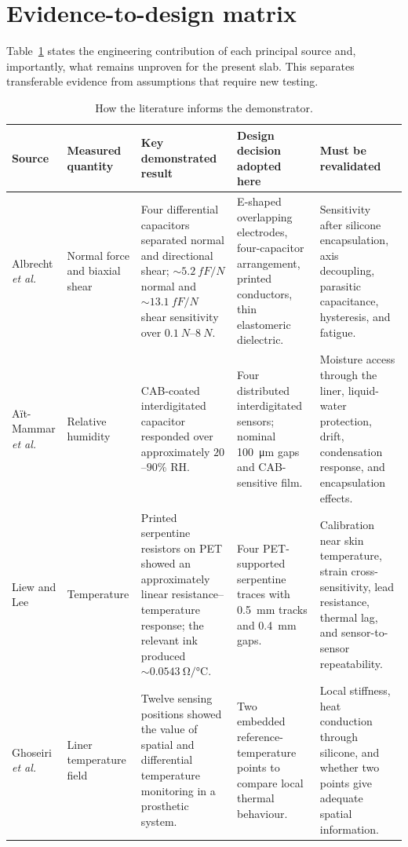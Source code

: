 \documentclass[10pt,twocolumn]{article}
\begin{document}
\section{Evidence-to-design matrix}

Table~\ref{tab:evidence} states the engineering contribution of each principal
source and, importantly, what remains unproven for the present slab. This
separates transferable evidence from assumptions that require new testing.

\begin{table}[t]
\centering
\caption{How the literature informs the demonstrator.}
\label{tab:evidence}
\footnotesize
\renewcommand{\arraystretch}{1.16}
\begin{tabularx}{\textwidth}{@{}p{}p{}
X X X@{}}
\toprule
\textbf{Source} & \textbf{Measured quantity} &
\textbf{Key demonstrated result} & \textbf{Design decision adopted here} &
\textbf{Must be revalidated} \\
\midrule
Albrecht \textit{et al.} \cite{albrecht2019} &
Normal force and biaxial shear &
Four differential capacitors separated normal and directional shear;
\(\sim\SI{5.2}{fF/N}\) normal and
\(\sim\SI{13.1}{fF/N}\) shear sensitivity over
\(\SIrange{0.1}{8}{N}\). &
E-shaped overlapping electrodes, four-capacitor arrangement, printed
conductors, thin elastomeric dielectric. &
Sensitivity after silicone encapsulation, axis decoupling, parasitic
capacitance, hysteresis, and fatigue. \\

Aït-Mammar \textit{et al.} \cite{aitmammar2020} &
Relative humidity &
CAB-coated interdigitated capacitor responded over approximately
\(20\)--\(90\%\) RH. &
Four distributed interdigitated sensors; nominal
\SI{100}{\micro\metre} gaps and CAB-sensitive film. &
Moisture access through the liner, liquid-water protection, drift,
condensation response, and encapsulation effects. \\

Liew and Lee \cite{liew2020} &
Temperature &
Printed serpentine resistors on PET showed an approximately linear
resistance--temperature response; the relevant ink produced
\(\sim\SI{0.0543}{\ohm/\degreeCelsius}\). &
Four PET-supported serpentine traces with
\SI{0.5}{mm} tracks and \SI{0.4}{mm} gaps. &
Calibration near skin temperature, strain cross-sensitivity, lead resistance,
thermal lag, and sensor-to-sensor repeatability. \\

Ghoseiri \textit{et al.} \cite{ghoseiri2018} &
Liner temperature field &
Twelve sensing positions showed the value of spatial and differential
temperature monitoring in a prosthetic system. &
Two embedded reference-temperature points to compare local thermal behaviour. &
Local stiffness, heat conduction through silicone, and whether two points give
adequate spatial information. \\


\end{tabularx}
\end{table}
\end{document}

